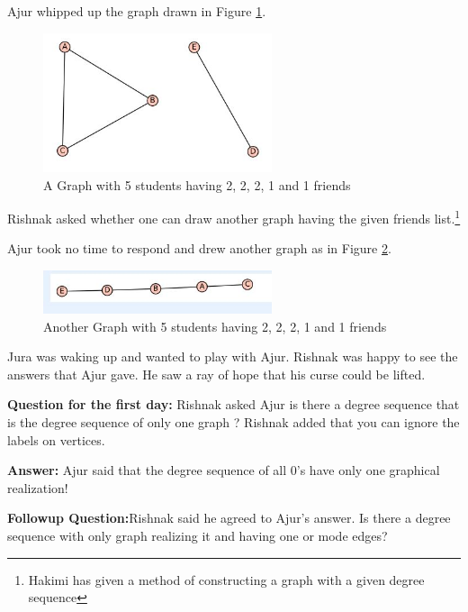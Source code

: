 Ajur whipped up the graph drawn in Figure \ref{dg3}. 

\begin{figure}
\begin{center}
\includegraphics[width=0.6\textwidth]{graphstory1-2.JPG}
\caption{A Graph with 5 students having 2, 2, 2, 1 and 1 friends}\label{dg3}
\end{center}
\end{figure}

Rishnak asked whether one can draw another graph having the given friends list.\footnote{Hakimi has given a method of constructing a graph with a given degree sequence}

Ajur took no time to respond and drew another graph as in Figure \ref{dg4}.

\begin{figure}
\begin{center}
\includegraphics[width=0.6\textwidth]{graphstory1-3.JPG}
\caption{Another Graph with 5 students having 2, 2, 2, 1 and 1 friends}\label{dg4}
\end{center}
\end{figure}

Jura was waking up and wanted to play with Ajur. Rishnak was happy to see the answers that Ajur gave. He saw a ray of hope that his curse could be lifted. 

\textbf{Question for the first day:} Rishnak asked Ajur is there a degree sequence that is the degree sequence of only one graph ? Rishnak added that you can ignore the labels on vertices.

\textbf{Answer:} Ajur said that the degree sequence of all 0's have only one graphical realization!

\textbf{Followup Question:}Rishnak said he agreed to Ajur's answer. Is there a degree sequence with only graph realizing it and having one or mode edges?

